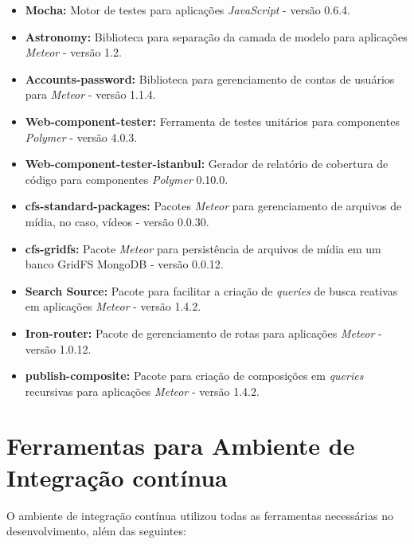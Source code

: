 \begin{apendicesenv}
\begin{itemize}
	\item \textbf{Mocha:} Motor de testes para aplicações \textit{JavaScript} - versão 0.6.4.
	\item \textbf{Astronomy:} Biblioteca para separação da camada de modelo para aplicações \textit{Meteor} - versão 1.2.
	\item \textbf{Accounts-password:} Biblioteca para gerenciamento de contas de usuários para \textit{Meteor} - versão 1.1.4.
	\item \textbf{Web-component-tester:} Ferramenta de testes unitários para componentes \textit{Polymer} - versão 4.0.3.
	\item \textbf{Web-component-tester-istanbul:} Gerador de relatório de cobertura de código para componentes \textit{Polymer} 0.10.0.
	\item \textbf{cfs-standard-packages:} Pacotes \textit{Meteor} para gerenciamento de arquivos de mídia, no caso, vídeos - versão 0.0.30.
	\item \textbf{cfs-gridfs:} Pacote \textit{Meteor} para persistência de arquivos de mídia em um banco GridFS MongoDB - versão 0.0.12.
	\item \textbf{Search Source:} Pacote para facilitar a criação de \textit{queries} de busca reativas em aplicações \textit{Meteor} - versão 1.4.2.
	\item \textbf{Iron-router:} Pacote de gerenciamento de rotas para aplicações \textit{Meteor} - versão 1.0.12. 
	\item \textbf{publish-composite:} Pacote para criação de composições em \textit{queries} recursivas para aplicações \textit{Meteor} - versão 1.4.2. 
\end{itemize}

\section{Ferramentas para Ambiente de Integração contínua}

O ambiente de integração contínua utilizou todas as ferramentas necessárias no desenvolvimento, além das seguintes:


\end{apendicesenv}
